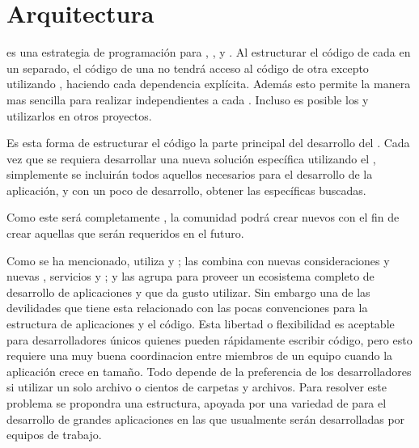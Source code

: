 \chapter{Arquitectura}\label{cap:arquitectura:section:generic_arquitectura}

\packagesAS es una estrategia de programación para \codeSeparationQA, \modularityAS, y \reusabilityQA. Al estructurar el código de cada \featureCPT en un \packagesAS separado, el código de una \featureCPT no tendrá acceso al código de otra \featureCPT excepto utilizando \exportCPT, haciendo cada dependencia explícita. Además esto permite la manera mas sencilla para realizar \testingCPT independientes a cada \featureCPT. Incluso es posible \publishINT los \packagesAS y utilizarlos en otros proyectos.

Es esta forma de estructurar el código la parte principal del desarrollo del \frameworkPC \ecommerceCOM. Cada vez que se requiera desarrollar una nueva solución específica utilizando el \frameworkPC, simplemente se incluirán todos aquellos \modulesAS necesarios para el desarrollo de la aplicación, y con un poco de desarrollo, obtener las \featuresCPT específicas buscadas.

Como este \frameworkPC será completamente \openSourcePC, la comunidad podrá crear nuevos \modulesAS con el fin de crear aquellas \featuresCPT que serán requeridos en el futuro.



Como se ha mencionado, \meteorNAME utiliza \librariesPC y \toolsCPT; las combina con nuevas consideraciones y nuevas \librariesPC, servicios y \standards; y las agrupa para proveer un ecosistema completo de desarrollo de aplicaciones \webINT y \mobileINT que da gusto utilizar. Sin embargo una de las devilidades que tiene 	\meteorNAME esta relacionado con las pocas convenciones para la estructura de aplicaciones y el código. Esta libertad o flexibilidad es aceptable para desarrolladores únicos quienes pueden rápidamente escribir código, pero esto requiere una muy buena coordinacion entre miembros de un equipo cuando la aplicación crece en tamaño. Todo depende de la preferencia de los desarrolladores si utilizar un solo archivo o cientos de carpetas y archivos. Para resolver este problema se propondra una estructura, apoyada por una variedad de \packagesAS para el desarrollo de grandes aplicaciones en las que usualmente serán desarrolladas por equipos de trabajo.

